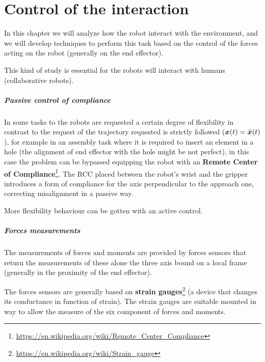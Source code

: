 \chapter{Control of the interaction}\label{ch:interaction-control}

In this chapter we will analyze how the robot interact with the environment, and we will develop techniques to perform this task based on the control of the forces acting on the robot (generally on the end effector).

This kind of study is essential for the robots will interact with humans (collaborative robots).

\paragraph{Passive control of compliance}

In some tasks to the robots are requested a certain degree of flexibility in contrast to the request of the trajectory requested is strictly followed ($\boldsymbol{x}(t)=\bar{\boldsymbol{x}}(t)$), for example in an assembly task where it is required to insert an element in a hole (the alignment of end effector with the hole might be not perfect), in this case the problem can be bypassed equipping the robot with an \textbf{Remote Center of Compliance}\footnote{\url{https://en.wikipedia.org/wiki/Remote_Center_Compliance}}.
The RCC placed between the robot's wrist and the gripper introduces a form of compliance for the axis perpendicular to the approach one, correcting misalignment in a passive way.

More flexibility behaviour can be gotten with an active control.

\paragraph{Forces measurements}

The measurements of forces and moments are provided by forces sensors that return the measurements of these alone the three axis bound on a local frame (generally in the proximity of the end effector).

The forces sensors are generally based on \textbf{strain gauges}\footnote{\url{https://en.wikipedia.org/wiki/Strain_gauge}} (a device that changes its conductance in function of strain).
The strain gauges are suitable mounted in way to allow the measure of the six component of forces and moments.

